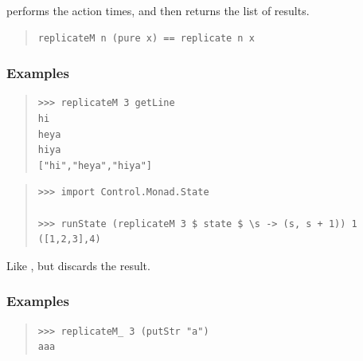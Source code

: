 \begin{haddockdesc}
\item[\begin{tabular}{@{}l}
replicateM :: Applicative m => Int -> m a -> m {\char 91}a{\char 93}
\end{tabular}]
{\haddockbegindoc
{} performs the action   times,
 and then returns the list of results.\par
\begin{quote}
{\haddockverb\begin{verbatim}
replicateM n (pure x) == replicate n x\end{verbatim}}
\end{quote}
\subsubsection*{\textbf{Examples}}
\begin{quote}
{\haddockverb\begin{verbatim}
>>> replicateM 3 getLine
hi
heya
hiya
["hi","heya","hiya"]

\end{verbatim}}
\end{quote}
\begin{quote}
{\haddockverb\begin{verbatim}
>>> import Control.Monad.State

>>> runState (replicateM 3 $ state $ \s -> (s, s + 1)) 1
([1,2,3],4)

\end{verbatim}}
\end{quote}}
\end{haddockdesc}
\begin{haddockdesc}
\item[\begin{tabular}{@{}l}
replicateM{\char '137} :: Applicative m => Int -> m a -> m ()
\end{tabular}]
{\haddockbegindoc
Like , but discards the result.\par
\subsubsection*{\textbf{Examples}}
\begin{quote}
{\haddockverb\begin{verbatim}
>>> replicateM_ 3 (putStr "a")
aaa

\end{verbatim}}
\end{quote}}
\end{haddockdesc}
